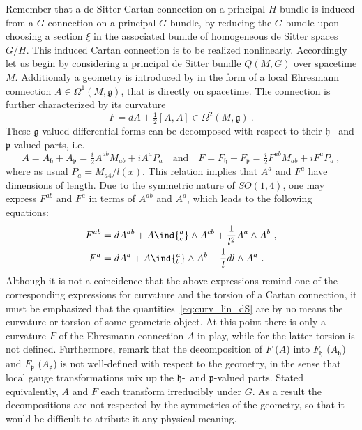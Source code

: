 \documentclass[11pt]{article}
\begin{document}
\blankline
Remember that a de Sitter-Cartan connection on a principal 
$H$-bundle is induced from a $G$-connection on a principal 
$G$-bundle, by reducing the $G$-bundle upon choosing a section 
$\xi$ in the associated bunlde of homogeneous de Sitter spaces 
$G/H$. This induced Cartan connection is to be realized 
nonlinearly. Accordingly let us begin by considering a principal 
de Sitter bundle $Q(M,G)$ over spacetime $M$.  Additionaly a 
geometry is introduced by in the form of a local Ehresmann 
connection $A \in \Omega^1(M, \mathfrak{g})$, that is directly on 
spacetime. The connection is further characterized by its 
curvature 
\begin{displaymath}
F = dA + \tfrac{1}{2}[A,A] \in \Omega^2(M,\mathfrak{g})~.
\end{displaymath}
These $\mathfrak{g}$-valued differential forms can be decomposed 
with respect to their $\mathfrak{h}$-~and $\mathfrak{p}$-valued 
parts, i.e.~
%
\begin{displaymath}
	A = A_\mathfrak{h} + A_\mathfrak{p}
	= \tfrac{i}{2} A^{ab} M_{ab} + iA^a P_a
	\quad\text{and}\quad
	F = F_\mathfrak{h} + F_\mathfrak{p}
	= \tfrac{i}{2} F^{ab} M_{ab} + iF^a P_a~,
\end{displaymath}
where as usual $P_a = M_{a4}/l(x)$. This relation implies that 
$A^a$ and $F^a$ have dimensions of length. Due to the symmetric 
nature of $SO(1,4)$, one may express $F^{ab}$ and $F^{a}$ in 
terms of $A^{ab}$ and $A^a$, which leads to the following 
equations: 
%
\begin{subequations}
	\label{eq:curv_lin_dS}
\begin{align}
	F^{ab} &= dA^{ab} + A\ind{^a_c} \wedge A^{cb} + \frac{1}{l^2} 
	A^a \wedge A^b~,
	\\
	F^a &= dA^a + A\ind{^a_b} \wedge A^b - \frac{1}{l} dl \wedge 
	A^a ~.
\end{align}
\end{subequations}
Although it is not a coincidence that the above expressions 
remind one of the corresponding expressions for curvature and the 
torsion of a Cartan connection, it must be emphasized that the 
quantities~\eqref{eq:curv_lin_dS} are by no means the curvature 
or torsion of some geometric object. At this point there is only 
a curvature $F$ of the Ehresmann connection $A$ in play, while 
for the latter torsion is not defined. Furthermore, remark that 
the decomposition of $F$ ($A$) into $F_\mathfrak{h}$ 
($A_\mathfrak{h}$) and $F_\mathfrak{p}$ ($A_\mathfrak{p}$) is not 
well-defined with respect to the geometry, in the sense that 
local gauge transformations mix up the $\mathfrak{h}$-~and 
$\mathfrak{p}$-valued parts. Stated equivalently, $A$ and $F$ 
each transform irreducibly under $G$.  As a result the 
decompositions are not respected by the symmetries of the 
geometry, so that it would be difficult to atribute it any 
physical meaning.
\end{document}

